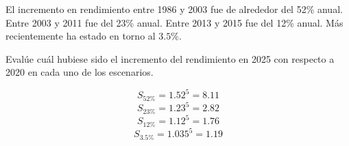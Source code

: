 \begin{acexercise}\end{acexercise}

El incremento en rendimiento entre 1986 y 2003 fue de alrededor del 52\% anual.
Entre 2003 y 2011 fue del 23\% anual.
Entre 2013 y 2015 fue del 12\% anual.
Más recientemente ha estado en torno al $3.5$\%.

Evalúe cuál hubiese sido el incremento del rendimiento en 2025 con respecto
a 2020 en cada uno de los escenarios.

\begin{acsolution}\end{acsolution}

\[S_{52\%} = 1.52^5 = 8.11\]
\[S_{23\%} = 1.23^5 = 2.82\]
\[S_{12\%} = 1.12^5 = 1.76\]
\[S_{3.5\%} = 1.035^5 = 1.19\]

